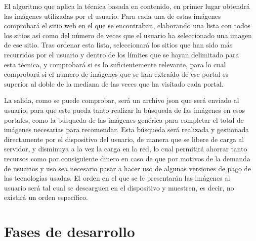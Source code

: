 

El algoritmo que aplica la técnica basada en contenido, en primer lugar obtendrá las imágenes utilizadas por el usuario. Para cada una de estas imágenes comprobará el sitio web en el que se encontraban, elaborando una lista con todos los sitios así como del número de veces que el usuario ha seleccionado una imagen de ese sitio. Tras ordenar esta lista, seleccionará los sitios que han sido más recurridos por el usuario y dentro de los límites que se hayan delimitado para esta técnica, y comprobará si es lo suficientemente relevante, para lo cual comprobará si el número de imágenes que se han extraído de ese portal es superior al doble de la mediana de las veces que ha visitado cada portal.


La salida, como se puede comprobar, será un archivo json que será enviado al usuario, para que este pueda tanto realizar la búsqueda de las imágenes en esos portales, como la búsqueda de las imágenes genérica para completar el total de imágenes necesarias para recomendar. Esta búsqueda será realizada y gestionada directamente por el dispositivo del usuario, de manera que se libere de carga al servidor, y disminuya a la vez la carga en la red, lo cual permitirá ahorrar tanto recursos como por consiguiente dinero en caso de que por motivos de la demanda de usuarios y uso sea necesario pasar a hacer uso de algunas versiones de pago de las tecnologías usadas. El orden en el que se le presentarán las imágenes al usuario será tal cual se descarguen en el dispositivo y muestren, es decir, no existirá un orden específico.

\section{Fases de desarrollo}













